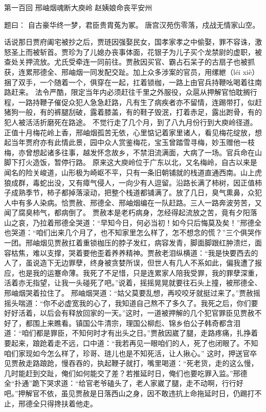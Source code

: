 \documentclass[12pt,oneside]{book}
\begin{document}
第一百回 邢岫烟魂断大庾岭 赵姨娘命丧平安州

题曰：
自古豪华终一梦，君臣贵胄菟为冢。
唐宫汉苑伤零落，戍战无情家山空。

话说那日贾府阖宅被抄之后，贾琏因强娶民女，国孝家孝之中偷娶，罪不容诛，激怒圣上而被斩首。贾珍为了儿媳办丧事体面，花银子为儿子买个龙禁尉的虚职，被查处关押流放。尤氏受牵连一同前往。贾赦因买官、霸占石呆子的古扇子也被抓获，连累邢德全、邢岫烟一同发配交趾。加上众多涉案的官员，用缧紲（léi xiè）捆了双手，一个随着一个，俱穿在一起，扛着锁枷，一路上由官兵持鞭吆喝着往南路赶来。
法令严酷，限定当年内必须赶往千里之外服役，众扈从押解官怕耽搁行程，一路持鞭子催促众犯人急急赶路，凡有生了病疾者亦不留情，连踢带打，似赶猪狗一般，有的裤腿刮破，露着膝盖，有的鞋子毁泯，打着赤足，露出跗骨，有的犯人被活活折磨死在路途。
不觉行走了几个月，到了八九月份行到大庾岭径道。正值十月梅花岭上香，邢岫烟孤苦无依，心里惦记着家里诸人，看见梅花绽放，想起当年贾府亦有此情此景，园中众人赏鉴梅花，宝玉曾踏雪寻梅，妙玉赠他一枝梅，亦曾想起诸多往事，越发怀念故乡，不禁泪流满面，大病了一场。官兵命在山脚下打火造饭，暂停行路。
原来这大庾岭位于广东以北，又名梅岭，自古以来是闻名的险关峻道，山形极为崎岖不平，只有一条旧朝铺就的栈道直通西南。山上虎狼成群，毒蛇出没，又有瘴气侵人，一向少有人逗留。沿路长满了柿树，因正值柿子成熟季节，柿子都掉落滚动，把整个栈道都铺满了。放了几日，臭气熏鼻，众犯人中有多人染病。恰贾赦、邢德全、邢岫烟编在一队赶路。三人一路奔波劳苦，又闻了腐臭柿气，都病倒了。
贾赦本是老朽病身，怎经得起流放之苦，竟有夕阳落山之哀，乃拉着邢德全哭道：“早知今日，何必当初！如今只后悔莫及矣！”邢德全也哭道：“咱们出来几个月了，也不知家里怎么样了，怎不想念的慌？”三个俱哭作一团。邢岫烟见贾赦扛着重锁枷压的脖子发红，病容发青，脚面脚跟红肿溃烂，面容枯焦，难以支撑，哭着要他歪着养养精神。贾赦老泪纵横道：“我是快要西去的人了，虽说造下无边罪孽，终身被贪婪所误，但世人有几人不系如此，偏我遭了报应，也是我的运蹇命薄。我死了不足惜，只是连累家人陪我受罪，我的罪孽深重，活着亦无指望，让我一头碰死了吧。”说着，摇摇晃晃就要往石头上撞，被邢德全、邢岫烟哭着拉住了。
邢岫烟哭道：“姑父莫要乱想，再咬咬牙就挺过来了。”贾赦摇摇头喘道：“你不必虚宽我的心了，我知道自己熬不了多久了。我死之后，你们要好好活着，以后会有释放回家的一天。”这时，一道被押解的几个犯官罪臣见贾赦不好了，都围上来瞧看。镇国公牛清宗，理国公柳彪、锦乡伯公子韩奇都含泪道：“咱们都是罪臣，不知何时才有出头之日。”贾赦因崴了腿，走路疼痛，扎挣着要起来，踉跄着走不远，口中道：“我若再见一眼咱们的人，死了也闭眼了。不知咱们家现如今怎么样了，珍哥、琏儿也是不知死活，让人揪心。”
这时，押送官卒见贾赦走路踉跄，慢吞吞的，执起鞭子就打，嘴里喝道：“死老货，走的这么慢，几时能赶到交趾，俺们如何能交了差？若推延时日，俺们也要吃罪入监。”邢德全“扑通”跪下哭求道：“给官老爷磕头了，老人家崴了腿，走不动啊，行行好吧。”押解官不依，虽见贾赦是日落西山之身，因不敢违抗上命拖延时日，仍踢打不止，邢德全只得搀扶着他走。
\end{document}
